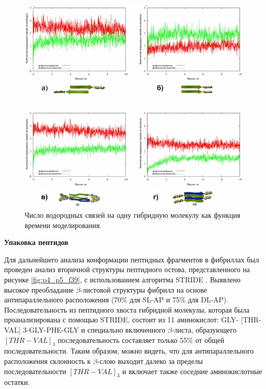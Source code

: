 \begin{figure} [H]
    \centering
    \includegraphics[width=\textwidth]{images/p4/punkt5/part4_p5_f38.pdf}
    \caption[Число водородных связей на одну гибридную молекулу как функция времени моделирования]{Число водородных связей на одну гибридную молекулу как функция времени моделирования.}
    \label{fig:p4_p5_f38}
\end{figure}


    \textbf{Упаковка пептидов}

    Для дальнейшего анализа конформации пептидных фрагментов в фибриллах был проведен анализ вторичной структуры пептидного остова, представленного на рисунке \ref{fig:p4_p5_f39}, с использованием алгоритма STRIDE \cite{frishman_knowledge-based_1995}. Выявлено высокое преобладание $\beta$-листовой структуры фибрилл на основе антипараллельного расположения (70\% для SL-AP и 75\% для DL-AP). Последовательность из пептидного хвоста гибридной молекулы, которая была проанализирована с помощью STRIDE, состоит из 11 аминокислот: GLY- [THR-VAL] 3-GLY-PHE-GLY и специально включенного $\beta$-листа, образующего $[THR-VAL]_3$ последовательность составляет только 55\% от общей последовательности. Таким образом, можно видеть, что для антипараллельного расположения склонность к $\beta$-слою выходит далеко за пределы последовательности $[THR-VAL]_3$ и включает также соседние аминокислотные остатки.

